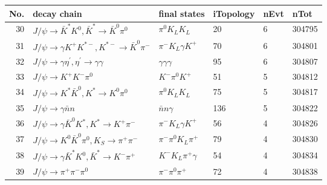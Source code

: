 \begin{table}[htbp] 
\begin{center}
\begin{small}
\begin{tabular}{rlllll}\hline\hline
 No. & decay chain & final states &  iTopology & nEvt & nTot \\\hline
 30&$J/\psi       \rightarrow \bar{K}^{*}   K^{0}          , \bar{K}^{*}    \rightarrow \bar{K}^{0}   \pi^{0}        $&$\pi^{0}        K_{L}          K_{L}          $&   20&    6&304795\\
 31&$J/\psi       \rightarrow \gamma       K^{+}          K^{*-}         , K^{*-}          \rightarrow \bar{K}^{0}   \pi^{-}        $&$\pi^{-}        K_{L}          \gamma       K^{+}          $&   70&    6&304801\\
 32&$J/\psi       \rightarrow \gamma       \eta^{\prime} , \eta^{\prime}  \rightarrow \gamma       \gamma       $&$\gamma       \gamma       \gamma       $&   95&    6&304807\\
 33&$J/\psi       \rightarrow K^{+}          K^{-}          \pi^{0}        $&$K^{-}          \pi^{0}        K^{+}          $&   51&    5&304812\\
 34&$J/\psi       \rightarrow K^{*}          \bar{K}^{0}   , K^{*}           \rightarrow K^{0}          \pi^{0}        $&$\pi^{0}        K_{L}          K_{L}          $&   75&    5&304817\\
 35&$J/\psi       \rightarrow \gamma       \bar{n}          n                 $&$\bar{n}          n                 \gamma       $&  136&    5&304822\\
 36&$J/\psi       \rightarrow \gamma       \bar{K}^{0}   K^{*}          , K^{*}           \rightarrow K^{+}          \pi^{-}        $&$\pi^{-}        K_{L}          \gamma       K^{+}          $&   56&    4&304826\\
 37&$J/\psi       \rightarrow K^{0}          \bar{K}^{0}   \pi^{0}        , K_{S}           \rightarrow \pi^{+}        \pi^{-}        $&$\pi^{-}        \pi^{0}        K_{L}          \pi^{+}        $&   79&    4&304830\\
 38&$J/\psi       \rightarrow \gamma       \bar{K}^{*}   K^{0}          , \bar{K}^{*}    \rightarrow K^{-}          \pi^{+}        $&$K^{-}          K_{L}          \pi^{+}        \gamma       $&   54&    4&304834\\
 39&$J/\psi       \rightarrow \pi^{+}        \pi^{-}        \pi^{0}        $&$\pi^{-}        \pi^{0}        \pi^{+}        $&   72&    4&304838\\

\end{tabular}
\end{small}
\end{center}
\end{table}
